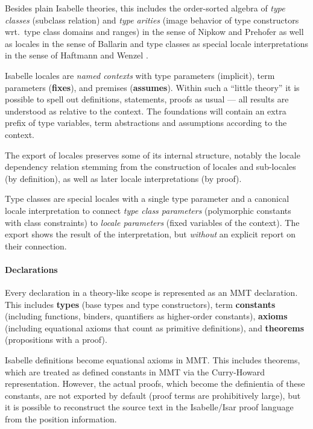 Besides plain Isabelle theories, this includes the order-sorted algebra of \emph{type classes} (subclass relation) and \emph{type arities} (image behavior of type constructors wrt.\ type class domains and ranges) in the sense of Nipkow and Prehofer \cite{Nipkow-Prehofer:1993} as well as locales in the sense of Ballarin \cite{Ballarin2014} and type classes as special locale interpretations in the sense of Haftmann and Wenzel \cite{Haftmann-Wenzel:2006:classes,Haftmann-Wenzel:2009}.

  Isabelle locales are \emph{named contexts} with type parameters
  (implicit), term parameters (\textbf{fixes}), and premises
  (\textbf{assumes}). Within such a ``little theory'' it is possible
  to spell out definitions, statements, proofs as usual --- all
  results are understood as relative to the context. The foundations
  will contain an extra prefix of type variables, term abstractions
  and assumptions according to the context.

  The export of locales preserves some of its internal structure,
  notably the locale dependency relation stemming from the
  construction of locales and sub-locales (by definition), as well as
  later locale interpretations (by proof).

  Type classes are special locales with a single type parameter and a
  canonical locale interpretation to connect \emph{type class
    parameters} (polymorphic constants with class constraints) to
  \emph{locale parameters} (fixed variables of the context). The
  export shows the result of the interpretation, but \emph{without} an
  explicit report on their connection.


\paragraph{Declarations}
Every declaration in a theory-like scope is represented as an MMT declaration.
This includes \textbf{types} (base types and type constructors),
  term \textbf{constants} (including functions, binders, quantifiers
  as higher-order constants), \textbf{axioms} (including equational
  axioms that count as primitive definitions), and \textbf{theorems}
  (propositions with a proof).

Isabelle definitions become equational axioms in MMT.
This includes theorems, which are treated as defined constants in MMT via the Curry-Howard representation.
However, the actual proofs, which become the definientia of these constants, are not exported by default (proof terms are prohibitively large), but it is possible to reconstruct the source text in the Isabelle/Isar proof language from the position information.

